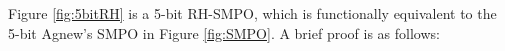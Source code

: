 Figure \ref{fig:5bitRH} is a 5-bit RH-SMPO, which is functionally equivalent to the 5-bit Agnew's SMPO 
in Figure \ref{fig:SMPO}. A brief proof is as follows: 

\begin{figure}[bp]
\end{figure}

